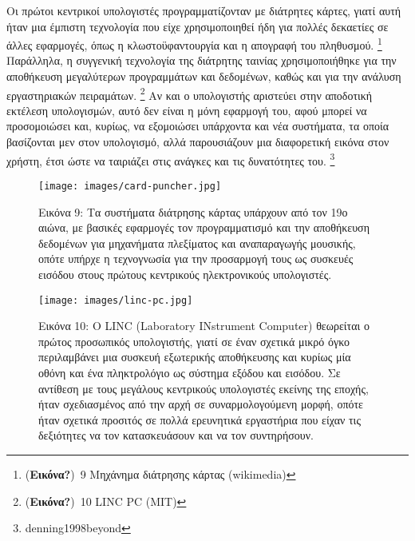 \documentclass[
]{article}
\begin{document}
Οι πρώτοι κεντρικοί υπολογιστές προγραμματίζονταν με διάτρητες κάρτες,
γιατί αυτή ήταν μια έμπιστη τεχνολογία που είχε χρησιμοποιηθεί ήδη για
πολλές δεκαετίες σε άλλες εφαρμογές, όπως η κλωστοϋφαντουργία και η
απογραφή του πληθυσμού. \footnote{(\textbf{Εικόνα?})~9 Μηχάνημα
  διάτρησης κάρτας (wikimedia)} Παράλληλα, η συγγενική τεχνολογία της
διάτρητης ταινίας χρησιμοποιήθηκε για την αποθήκευση μεγαλύτερων
προγραμμάτων και δεδομένων, καθώς και για την ανάλυση εργαστηριακών
πειραμάτων. \footnote{(\textbf{Εικόνα?})~10 LINC PC (MIT)} Αν και ο
υπολογιστής αριστεύει στην αποδοτική εκτέλεση υπολογισμών, αυτό δεν
είναι η μόνη εφαρμογή του, αφού μπορεί να προσομοιώσει και, κυρίως, να
εξομοιώσει υπάρχοντα και νέα συστήματα, τα οποία βασίζονται μεν στον
υπολογισμό, αλλά παρουσιάζουν μια διαφορετική εικόνα στον χρήστη, έτσι
ώστε να ταιριάζει στις ανάγκες και τις δυνατότητες του. \footnote{denning1998beyond}

\leavevmode{}%
\begin{figure}
\hypertarget{fig:card-puncher}{%
\centering
\texttt{[image: images/card-puncher.jpg]}
\caption{Εικόνα 9: Τα συστήματα διάτρησης κάρτας υπάρχουν από τον 19ο
αιώνα, με βασικές εφαρμογές τον προγραμματισμό και την αποθήκευση
δεδομένων για μηχανήματα πλεξίματος και αναπαραγωγής μουσικής, οπότε
υπήρχε η τεχνογνωσία για την προσαρμογή τους ως συσκευές εισόδου στους
πρώτους κεντρικούς ηλεκτρονικούς υπολογιστές.}\label{fig:card-puncher}
}
\end{figure}

\leavevmode{}%
\begin{figure}
\hypertarget{fig:linc-pc}{%
\centering
\texttt{[image: images/linc-pc.jpg]}
\caption{Εικόνα 10: O LINC (Laboratory INstrument Computer) θεωρείται ο
πρώτος προσωπικός υπολογιστής, γιατί σε έναν σχετικά μικρό όγκο
περιλαμβάνει μια συσκευή εξωτερικής αποθήκευσης και κυρίως μία οθόνη και
ένα πληκτρολόγιο ως σύστημα εξόδου και εισόδου. Σε αντίθεση με τους
μεγάλους κεντρικούς υπολογιστές εκείνης της εποχής, ήταν σχεδιασμένος
από την αρχή σε συναρμολογούμενη μορφή, οπότε ήταν σχετικά προσιτός σε
πολλά ερευνητικά εργαστήρια που είχαν τις δεξιότητες να τον
κατασκευάσουν και να τον συντηρήσουν.}\label{fig:linc-pc}
}
\end{figure}
\end{document}
